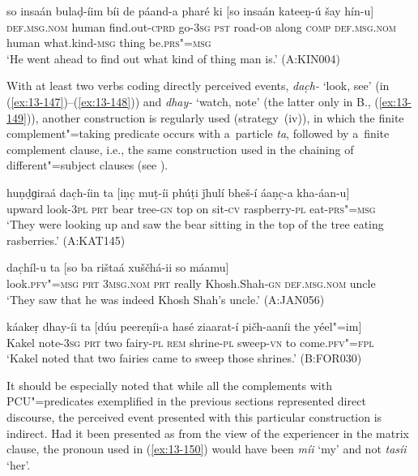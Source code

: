\begin{exe}
\ex
\label{ex:13-146}
\gll so insaán bulaḍ-íim bíi de páand-a  pharé ki [so insaán kateeṇ-ú
  šay  hín-u] \\
\textsc{def.msg.nom} human find.out-\textsc{cprd} go-\textsc{3sg} \textsc{pst} road-\textsc{ob}  along \textsc{comp} \textsc{def.msg.nom} human what.kind-\textsc{msg} thing be.\textsc{prs"=msg} \\
\glt `He went ahead to find out what kind of thing man is.' (A:KIN004) 
\end{exe}

 With at least two verbs coding directly perceived events, \textit{dac̣h-} `look, see' (in (\ref{ex:13-147})--(\ref{ex:13-148})) and \textit{dhay-} `watch, note' (the latter only in B., (\ref{ex:13-149})), another construction is regularly used (strategy~(iv)), in which the finite complement"=taking predicate occurs with a~particle \textit{ta}, followed by a~finite complement clause, i.e., the same construction used in the chaining of different"=subject clauses (see ). 

\begin{exe}
\ex
\label{ex:13-147}
\gll huṇḍɡiraá dac̣h-íin ta [iṇc̣ muṭ-íi phúṭi ǰhulí  bheš-í áaṇc̣-a kha-áan-u] \\
upward look-\textsc{3pl} \textsc{prt} bear tree-\textsc{gn} top on sit-\textsc{cv} raspberry-\textsc{pl} eat-\textsc{prs"=msg}  \\
\glt `They were looking up and saw the bear sitting in the top of the tree eating rasberries.' (A:KAT145)

\ex
\label{ex:13-148}
\gll dac̣híl-u ta [so ba rištaá  xuščhá-ii so máamu] \\
look.\textsc{pfv"=msg} \textsc{prt} \textsc{3msg.nom} \textsc{prt} really Khosh.Shah-\textsc{gn} \textsc{def.msg.nom} uncle  \\
\glt `They saw that he was indeed Khosh Shah's uncle.' (A:JAN056)

\ex
\label{ex:13-149}
\gll káakeṛ dhay-íi ta [dúu peereṇíi-a hasé ziaarat-í  pičh-aaníi the yéel"=im] \\
Kakel note-\textsc{3sg} \textsc{prt} two fairy-\textsc{pl}  \textsc{rem} shrine-\textsc{pl} sweep-\textsc{vn} to come.\textsc{pfv"=fpl} \\
\glt `Kakel noted that two fairies came to sweep those shrines.' (B:FOR030) 
\end{exe}

It should be especially noted that while all the complements with PCU"=predicates exemplified in the previous sections represented direct discourse, the perceived event presented with this particular construction is indirect. Had it been presented as from the view of the experiencer in the matrix clause, the pronoun used in (\ref{ex:13-150}) would have been \textit{míi} `my' and not \textit{tasíi} `her'.

